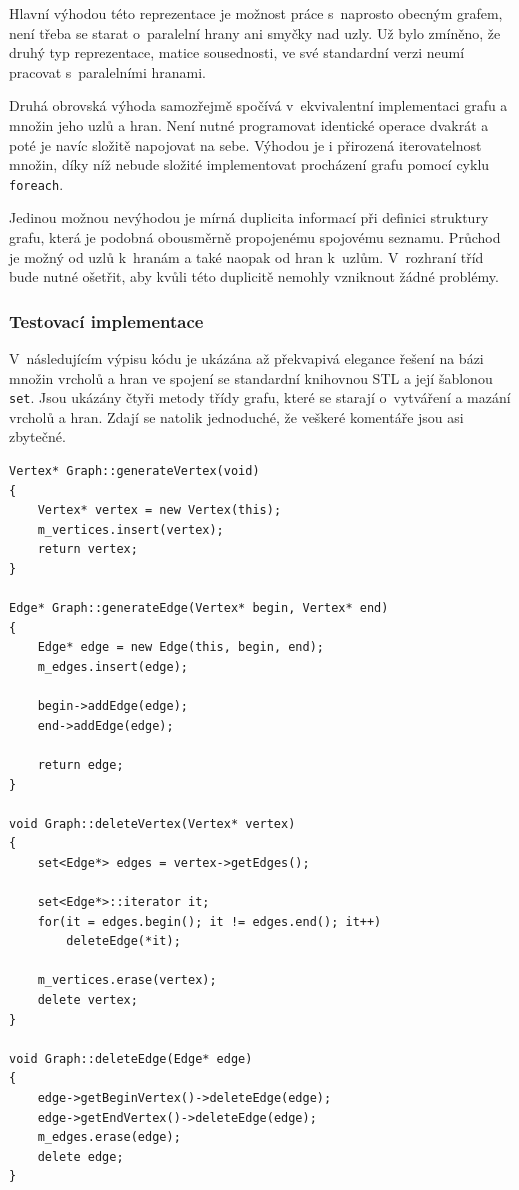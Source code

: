 \documentclass[11pt,twoside,a4paper]{book}
\begin{document}
Hlavní výhodou této reprezentace je možnost práce s~naprosto obecným grafem, není třeba se starat o~paralelní hrany ani smyčky nad uzly. Už bylo zmíněno, že druhý typ reprezentace, matice sousednosti, ve své standardní verzi neumí pracovat s~paralelními hranami.

Druhá obrovská výhoda samozřejmě spočívá v~ekvivalentní implementaci grafu a množin jeho uzlů a hran. Není nutné programovat identické operace dvakrát a poté je navíc složitě napojovat na sebe. Výhodou je i přirozená iterovatelnost množin, díky níž nebude složité implementovat procházení grafu pomocí cyklu \texttt{foreach}.

Jedinou možnou nevýhodou je mírná duplicita informací při definici struktury gra\-fu, která je podobná obousměrně propojenému spojovému seznamu. Průchod je možný od uzlů k~hranám a také naopak od hran k~uzlům. V~rozhraní tříd bude nutné ošetřit, aby kvůli této duplicitě nemohly vzniknout žádné problémy.


\subsubsection{Testovací implementace}

V~následujícím výpisu kódu je ukázána až překvapivá elegance řešení na bázi množin vrcholů a hran ve spojení se standardní knihovnou STL a její šablonou \texttt{set}. Jsou ukázány čtyři metody třídy grafu, které se starají o~vytváření a mazání vrcholů a hran. Zdají se natolik jednoduché, že veškeré komentáře jsou asi zbytečné.

\begin{verbatim}
Vertex* Graph::generateVertex(void)
{
    Vertex* vertex = new Vertex(this);
    m_vertices.insert(vertex);
    return vertex;
}

Edge* Graph::generateEdge(Vertex* begin, Vertex* end)
{
    Edge* edge = new Edge(this, begin, end);
    m_edges.insert(edge);

    begin->addEdge(edge);
    end->addEdge(edge);

    return edge;
}

void Graph::deleteVertex(Vertex* vertex)
{
    set<Edge*> edges = vertex->getEdges();

    set<Edge*>::iterator it;
    for(it = edges.begin(); it != edges.end(); it++)
        deleteEdge(*it);

    m_vertices.erase(vertex);
    delete vertex;
}

void Graph::deleteEdge(Edge* edge)
{
    edge->getBeginVertex()->deleteEdge(edge);
    edge->getEndVertex()->deleteEdge(edge);
    m_edges.erase(edge);
    delete edge;
}
\end{verbatim}
\end{document}
